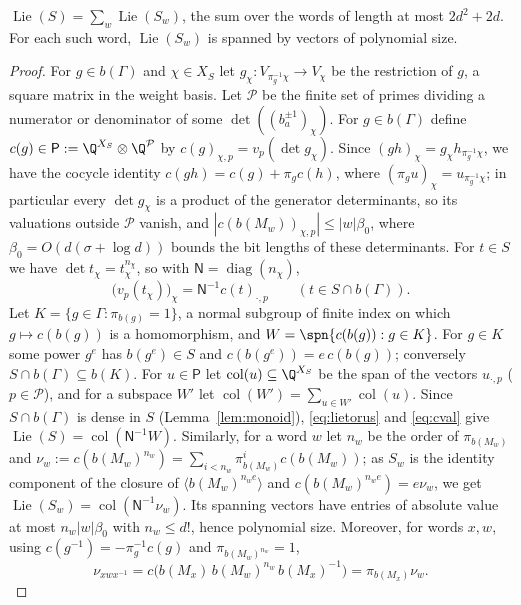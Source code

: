 \begin{lemma}\label{lem:torus}
$\operatorname{Lie}(S)=\sum_w\operatorname{Lie}(S_w)$, the sum over the words of length at most $2d^2+2d$. For each such
word, $\operatorname{Lie}(S_w)$ is spanned by vectors of polynomial size.
\end{lemma}
\begin{proof}
For $g\in b(\Gamma)$ and $\chi\in X_S$ let $g_\chi:V_{\pi_g^{-1}\chi}\to V_\chi$ be the restriction
of $g$, a square matrix in the weight basis. Let $\mathcal P$ be the finite set of primes dividing a
numerator or denominator of some $\det((b_a^{\pm1})_\chi)$. For $g\in b(\Gamma)$ define
$c(g)\in\mathsf P:=\Q^{X_S}\otimes\Q^{\mathcal P}$ by $c(g)_{\chi,p}=v_p(\det g_\chi)$. Since
$(gh)_\chi=g_\chi h_{\pi_g^{-1}\chi}$, we have the cocycle identity $c(gh)=c(g)+\pi_gc(h)$, where
$(\pi_gu)_\chi=u_{\pi_g^{-1}\chi}$; in particular every $\det g_\chi$ is a product of the generator
determinants, so its valuations outside $\mathcal P$ vanish, and $|c(b(M_w))_{\chi,p}|\le|w|\beta_0$, where
$\beta_0=O(d(\sigma+\log d))$ bounds the bit lengths of these determinants. For
$t\in S$ we have $\det t_\chi=t_\chi^{n_\chi}$, so with $\mathsf N=\operatorname{diag}(n_\chi)$,
\begin{equation}\label{eq:cval}
\bigl(v_p(t_\chi)\bigr)_\chi=\mathsf N^{-1}c(t)_{\cdot,p}\qquad(t\in S\cap b(\Gamma)).
\end{equation}
Let $K=\{g\in\Gamma:\pi_{b(g)}=1\}$, a normal subgroup of finite index on which $g\mapsto c(b(g))$ is
a homomorphism, and $W=\spn\{c(b(g)):g\in K\}$. For $g\in K$ some power $g^e$ has $b(g^e)\in S$ and
$c(b(g^e))=e\,c(b(g))$; conversely $S\cap b(\Gamma)\subseteq b(K)$. For $u\in\mathsf P$ let
$\operatorname{col}(u)\subseteq\Q^{X_S}$ be the span of the vectors $u_{\cdot,p}$ ($p\in\mathcal P$), and for a
subspace $W'$ let $\operatorname{col}(W')=\sum_{u\in W'}\operatorname{col}(u)$. Since $S\cap b(\Gamma)$ is dense in $S$
(Lemma~\ref{lem:monoid}), \eqref{eq:lietorus} and \eqref{eq:cval} give
$\operatorname{Lie}(S)=\operatorname{col}(\mathsf N^{-1}W)$. Similarly, for a word $w$ let $n_w$ be the order of
$\pi_{b(M_w)}$ and $\nu_w:=c(b(M_w)^{n_w})=\sum_{i<n_w}\pi_{b(M_w)}^ic(b(M_w))$; as
$S_w$ is the identity component of the closure of $\langle b(M_w)^{n_we}\rangle$ and
$c(b(M_w)^{n_we})=e\nu_w$, we get $\operatorname{Lie}(S_w)=\operatorname{col}(\mathsf N^{-1}\nu_w)$. Its spanning vectors
have entries of absolute value at most $n_w|w|\beta_0$ with $n_w\le d!$, hence polynomial size. Moreover, for
words $x,w$, using $c(g^{-1})=-\pi_g^{-1}c(g)$ and $\pi_{b(M_w)^{n_w}}=1$,
\begin{equation}\label{eq:conjnu}
\nu_{xwx^{-1}}=c\bigl(b(M_x)\,b(M_w)^{n_w}\,b(M_x)^{-1}\bigr)=\pi_{b(M_x)}\nu_w .
\end{equation}


\end{proof}
